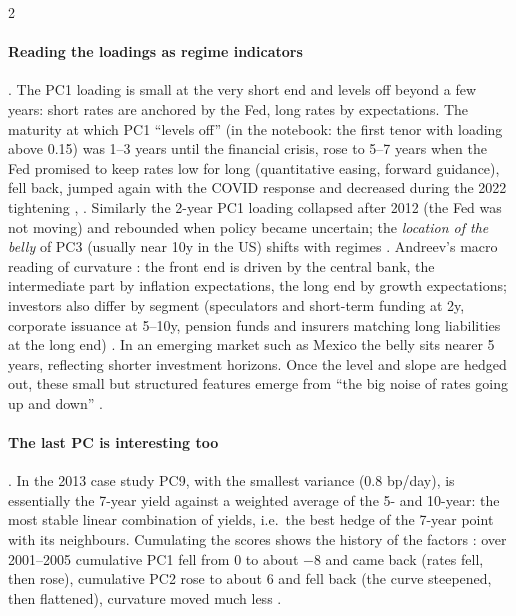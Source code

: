 \begin{paracol}{2}
\paragraph{Reading the loadings as regime indicators} . The PC1 loading is small at the very
short end and levels off beyond a few years: short rates are anchored by the Fed, long rates by
expectations. The maturity at which PC1 ``levels off'' (in the notebook: the first tenor with loading above
0.15) was 1--3 years until the financial crisis, rose to 5--7 years when the Fed promised to keep rates
low for long (quantitative easing, forward guidance), fell back, jumped again with the COVID response and
decreased during the 2022 tightening , . Similarly the 2-year PC1 loading
collapsed after 2012 (the Fed was not moving) and rebounded when policy became uncertain; the
\emph{location of the belly} of PC3 (usually near 10y in the US) shifts with regimes .
Andreev's macro reading of curvature : the front end is driven by the central bank, the
intermediate part by inflation expectations, the long end by growth expectations; investors also differ by
segment (speculators and short-term funding at 2y, corporate issuance at 5--10y, pension funds and insurers
matching long liabilities at the long end) . In an emerging market such as Mexico the belly
sits nearer 5 years, reflecting shorter investment horizons. Once the level and slope are hedged out, these
small but structured features emerge from ``the big noise of rates going up and down'' .

\paragraph{The last PC is interesting too} . In the 2013 case study PC9, with the smallest
variance (0.8 bp/day), is essentially the 7-year yield against a weighted average of the 5- and 10-year: the
most stable linear combination of yields, i.e.\ the best hedge of the 7-year point with its neighbours.
Cumulating the scores shows the history of the factors : over 2001--2005 cumulative PC1
fell from 0 to about $-8$ and came back (rates fell, then rose), cumulative PC2 rose to about 6 and fell back
(the curve steepened, then flattened), curvature moved much less .


\end{paracol}
